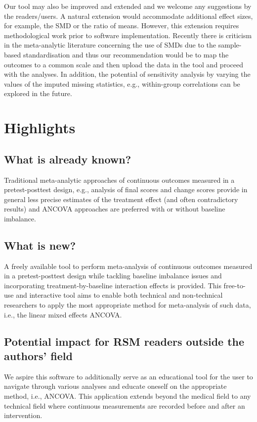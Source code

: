 \documentclass[AMA,STIX1COL]{WileyNJD-v2}
\begin{document}
Our tool may also be improved and extended and we welcome any suggestions by the readers/users. A natural extension would accommodate additional effect sizes, for example, the SMD or the ratio of means. However, this extension requires methodological work prior to software implementation. Recently there is criticism in the meta-analytic literature concerning the use of SMDs due to the sample-based standardisation \cite{daly2021nice, cuijpers2017pre, kraft2020interpreting, cuijpers2021has} and thus our recommendation would be to map the outcomes to a common scale and then upload the data in the tool and proceed with the analyses. In addition, the potential of sensitivity analysis by varying the values of the imputed missing statistics, e.g., within-group correlations can be explored in the future.


\section*{Highlights}
\subsection*{What is already known?}
Traditional meta-analytic approaches of continuous outcomes measured in a pretest-posttest design, e.g., analysis of final scores and change scores provide in general less precise estimates of the treatment effect (and often contradictory results) and ANCOVA approaches are preferred with or without baseline imbalance.

\subsection*{What is new?}
A freely available tool to perform meta-analysis of continuous outcomes measured in a pretest-posttest design while tackling baseline imbalance issues and incorporating treatment-by-baseline interaction effects is provided. This free-to-use and interactive tool aims to enable both technical and non-technical researchers to apply the most appropriate method for meta-analysis of such data, i.e., the linear mixed effects ANCOVA.

\subsection*{Potential impact for RSM readers outside the authors’ field}
We aspire this software to additionally serve as an educational tool for the user to navigate through various analyses and educate oneself on the appropriate method, i.e., ANCOVA. This application extends beyond the medical field to any technical field where continuous measurements are recorded before and after an intervention.
\end{document}
